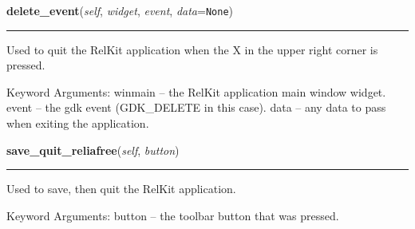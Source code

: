     \vspace{0.5ex}

\hspace{.8\funcindent}\begin{boxedminipage}{\funcwidth}

    \raggedright \textbf{delete\_event}(\textit{self}, \textit{widget}, \textit{event}, \textit{data}={\tt None})

    \vspace{-1.5ex}

    \rule{\textwidth}{0.5\fboxrule}
\setlength{\parskip}{2ex}
    Used to quit the RelKit application when the X in the upper right 
    corner is pressed.

    Keyword Arguments: winmain -- the RelKit application main window 
    widget. event   -- the gdk event (GDK\_DELETE in this case). data    --
    any data to pass when exiting the application.

\setlength{\parskip}{1ex}
    \end{boxedminipage}

    \label{reliafree:tree:TreeWindow:save_quit_reliafree}

    \vspace{0.5ex}

\hspace{.8\funcindent}\begin{boxedminipage}{\funcwidth}

    \raggedright \textbf{save\_quit\_reliafree}(\textit{self}, \textit{button})

    \vspace{-1.5ex}

    \rule{\textwidth}{0.5\fboxrule}
\setlength{\parskip}{2ex}
    Used to save, then quit the RelKit application.

    Keyword Arguments: button -- the toolbar button that was pressed.

\setlength{\parskip}{1ex}
    \end{boxedminipage}

    \label{reliafree:tree:TreeWindow:quit_reliafree}

    \vspace{0.5ex}

